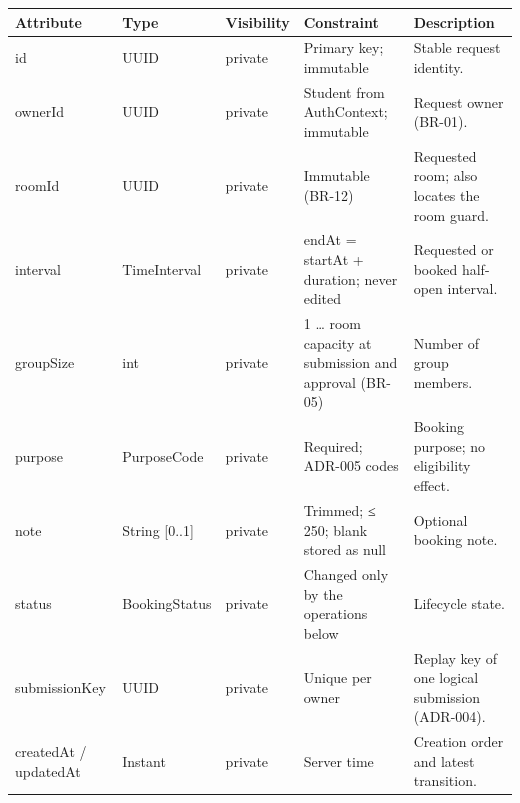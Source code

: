 \small
\setlength{\tabcolsep}{3pt}
\renewcommand{\arraystretch}{1.12}
\begin{longtable}{|p{}|p{}|p{}|p{}|p{}|}
\hline
\textbf{Attribute} & \textbf{Type} & \textbf{Visibility} & \textbf{Constraint} & \textbf{Description} \\ \hline
\endfirsthead \hline
id & UUID & private & Primary key; immutable & Stable request identity. \\ \hline
ownerId & UUID & private & Student from AuthContext; immutable & Request owner (BR-01). \\ \hline
roomId & UUID & private & Immutable (BR-12) & Requested room; also locates the room guard. \\ \hline
interval & TimeInterval & private & endAt = startAt + duration; never edited & Requested or booked half-open interval. \\ \hline
groupSize & int & private & 1 … room capacity at submission and approval (BR-05) & Number of group members. \\ \hline
purpose & PurposeCode & private & Required; ADR-005 codes & Booking purpose; no eligibility effect. \\ \hline
note & String [0..1] & private & Trimmed; ≤ 250; blank stored as null & Optional booking note. \\ \hline
status & BookingStatus & private & Changed only by the operations below & Lifecycle state. \\ \hline
submissionKey & UUID & private & Unique per owner & Replay key of one logical submission (ADR-004). \\ \hline
createdAt / updatedAt & Instant & private & Server time & Creation order and latest transition. \\ \hline
\end{longtable}
\normalsize

